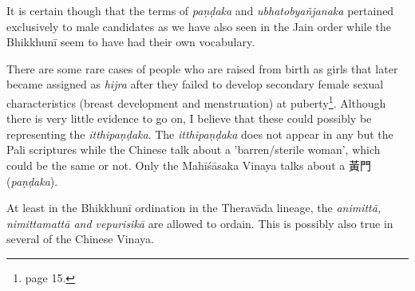 It is certain though that the terms of {\em paṇḍaka} and {\em ubhatob­yañ­janaka} pertained exclusively to male candidates as we have also seen in the Jain order while the Bhikkhunī seem to have had their own vocabulary.

There are some rare cases of people who are raised from birth as girls that later became assigned as {\em hijra} after they failed to develop secondary female sexual characteristics (breast development and menstruation) at puberty\footnote{\cite{nanda} page 15.}. Although there is very little evidence to go on, I believe that these could possibly be representing the {\em itthipaṇḍaka}. The {\em itthipaṇḍaka} does not appear in any but the Pali scriptures while the Chinese talk about a 'barren/sterile woman', which could be the same or not. Only the Mahīśāsaka Vinaya talks about a 黃門 ({\em paṇḍaka}). 

At least in the Bhikkhunī ordination in the Theravāda lineage, the {\em animittā, nimittamattā and vepurisikā} are allowed to ordain. This is possibly also true in several of the Chinese Vinaya.

